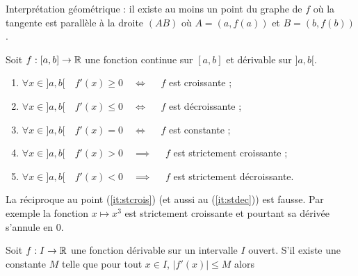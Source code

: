 \documentclass[10pt,class=article,crop=false]{standalone}
\begin{document}
\begin{multicols}{2}

Interprétation géométrique : il existe au moins un point du graphe de $f$ où la tangente est
parallèle à la droite $(AB)$ où $A=(a,f(a))$ et $B=(b,f(b))$.




\begin{corollaire}
	Soit $f:[a,b] \to \mathbb{R}$ une fonction continue sur $[a,b]$ et dérivable sur $]a,b[$.
	\begin{enumerate}
		\item \label{it:crois}$\forall x \in ]a,b[ \quad f'(x) \ge 0 \quad \iff \quad$ $f$ est croissante ;
		\item $\forall x \in ]a,b[ \quad f'(x) \le 0 \quad \iff \quad$ $f$ est décroissante ;
		\item  $\forall x \in ]a,b[ \quad f'(x) = 0 \quad \iff \quad$ $f$ est constante ;
		\item \label{it:stcrois} $\forall x \in ]a,b[ \quad f'(x) > 0 \quad \implies \quad$ $f$ est strictement croissante ;
		\item \label{it:stdec} $\forall x \in ]a,b[ \quad f'(x) < 0 \quad \implies \quad$ $f$ est strictement décroissante.
	\end{enumerate}
\end{corollaire}

La réciproque au point (\ref{it:stcrois}) (et aussi au  (\ref{it:stdec})) est fausse.
Par exemple la fonction $x \mapsto x^3$ est strictement croissante et pourtant sa dérivée s'annule en $0$.





\begin{corollaire}
	Soit $f : I \to \mathbb{R}$ une fonction dérivable sur un intervalle $I$ ouvert.
	S'il existe une constante $M$ telle que pour tout $x \in I$, $\big|f'(x)\big| \le M$ alors
\end{corollaire}



\end{multicols}
\end{document}
